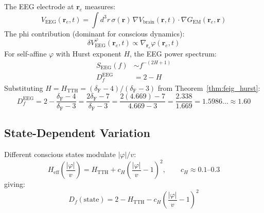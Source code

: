 \documentclass[12pt,a4paper]{article}
\newcommand{\Hurst}{H_{\mathrm{TTH}}}
\newcommand{\Feig}{\delta_{\mathrm{F}}}
\numberwithin{equation}{section}
\begin{document}
The EEG electrode at $\mathbf{r}_e$ measures:
\begin{equation}
  V_{\mathrm{EEG}}(\mathbf{r}_e,t) = \int d^3r\,
  \sigma(\mathbf{r})\,\nabla V_{\mathrm{brain}}(\mathbf{r},t)\cdot\nabla G_{\mathrm{EM}}(\mathbf{r}_e,\mathbf{r})
  \label{eq:EEG_def}
\end{equation}
The phi contribution (dominant for conscious dynamics):
\begin{equation}
  \delta V_{\mathrm{EEG}}^{\varphi}(\mathbf{r}_e,t) \propto \nabla_{\mathbf{r}_e}\varphi(\mathbf{r}_e,t)
  \label{eq:EEG_phi}
\end{equation}
For self-affine $\varphi$ with Hurst exponent $H$, the EEG power spectrum:
\begin{align}
  S_{\mathrm{EEG}}(f) &\sim f^{-(2H+1)} \label{eq:EEG_spectrum}\\
  D_f^{\mathrm{EEG}} &= 2 - H \label{eq:EEG_dim}
\end{align}
Substituting $H = \Hurst = (\Feig-4)/(\Feig-3)$ from Theorem~\ref{thm:feig_hurst}:
\begin{equation}
  D_f^{\mathrm{EEG}} = 2 - \frac{\Feig-4}{\Feig-3}
  = \frac{2\Feig - 7}{\Feig - 3}
  = \frac{2(4.669) - 7}{4.669 - 3}
  = \frac{2.338}{1.669} = 1.5986\ldots \approx 1.60
  \label{eq:Df_numerical}
\end{equation}

\subsection{State-Dependent Variation}

Different conscious states modulate $|\varphi|/v$:
\begin{equation}
  H_{\mathrm{eff}}\!\left(\frac{|\varphi|}{v}\right)
  = \Hurst + c_H\!\left(\frac{|\varphi|}{v} - 1\right)^{\!2},
  \qquad c_H \approx 0.1\text{--}0.3
  \label{eq:H_eff}
\end{equation}
giving:
\begin{equation}
  D_f(\mathrm{state}) = 2 - \Hurst - c_H\!\left(\frac{|\varphi|}{v} - 1\right)^{\!2}
  \label{eq:Df_state}
\end{equation}
\end{document}
